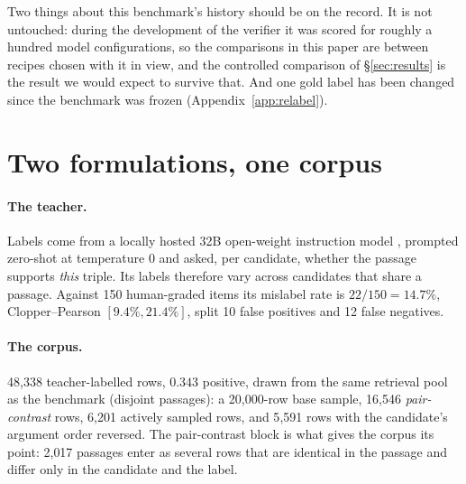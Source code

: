 \documentclass[11pt]{article}
\begin{document}
Two things about this benchmark's history should be on the record. It is not untouched: during the
development of the verifier it was scored for roughly a hundred model configurations, so the
comparisons in this paper are between recipes chosen with it in view, and the controlled comparison
of \S\ref{sec:results} is the result we would expect to survive that. And one gold label has been
changed since the benchmark was frozen (Appendix~\ref{app:relabel}).

\section{Two formulations, one corpus}
\label{sec:verifier}

\paragraph{The teacher.}
Labels come from a locally hosted 32B open-weight instruction model \citep{qwen2025technical},
prompted zero-shot at temperature 0 and asked, per candidate, whether the passage supports
\emph{this} triple. Its labels therefore vary across candidates that share a passage. Against 150
human-graded items its mislabel rate is $22/150 = 14.7\%$, Clopper--Pearson $[9.4\%, 21.4\%]$, split
10 false positives and 12 false negatives.

\paragraph{The corpus.}
48{,}338 teacher-labelled rows, $0.343$ positive, drawn from the same retrieval pool as the
benchmark (disjoint passages): a 20{,}000-row base sample, 16{,}546 \emph{pair-contrast} rows,
6{,}201 actively sampled rows, and 5{,}591 rows with the candidate's argument order reversed. The
pair-contrast block is what gives the corpus its point: 2{,}017 passages enter as several rows that
are identical in the passage and differ only in the candidate and the label.
\end{document}
